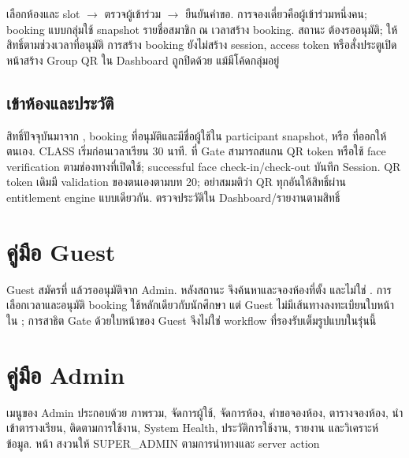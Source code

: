 เลือกห้องและ slot $\rightarrow$ ตรวจผู้เข้าร่วม $\rightarrow$ ยืนยันคำขอ. การจองเดี่ยวคือผู้เข้าร่วมหนึ่งคน; booking แบบกลุ่มใช้ snapshot รายชื่อสมาชิก ณ เวลาสร้าง booking. สถานะ  ต้องรออนุมัติ;  ให้สิทธิ์ตามช่วงเวลาที่อนุมัติ การสร้าง booking ยังไม่สร้าง session, access token หรือสั่งประตูเปิด หน้าสร้าง Group QR ใน Dashboard ถูกปิดด้วย  แม้มีโค้ดกลุ่มอยู่
\section*{เข้าห้องและประวัติ}
สิทธิ์ปัจจุบันมาจาก , booking ที่อนุมัติและมีชื่อผู้ใช้ใน participant snapshot, หรือ  ที่ออกให้ตนเอง. CLASS เริ่มก่อนเวลาเรียน 30 นาที. ที่ Gate สามารถสแกน QR token หรือใช้ face verification ตามช่องทางที่เปิดใช้; successful face check-in/check-out บันทึก Session. QR token เดิมมี validation ของตนเองตามบท 20; อย่าสมมติว่า QR ทุกอันให้สิทธิ์ผ่าน entitlement engine แบบเดียวกัน. ตรวจประวัติใน Dashboard/รายงานตามสิทธิ์

\chapter{คู่มือ Guest}
Guest สมัครที่  แล้วรออนุมัติจาก Admin. หลังสถานะ  จึงค้นหาและจองห้องที่ตั้ง  และไม่ใช่ . การเลือกเวลาและอนุมัติ booking ใช้หลักเดียวกับนักศึกษา แต่ Guest ไม่มีเส้นทางลงทะเบียนใบหน้าใน ; การสาธิต Gate ด้วยใบหน้าของ Guest จึงไม่ใช่ workflow ที่รองรับเต็มรูปแบบในรุ่นนี้

\begin{enumerate}
\end{enumerate}

\chapter{คู่มือ Admin}
เมนูของ Admin ประกอบด้วย ภาพรวม, จัดการผู้ใช้, จัดการห้อง, คำขอจองห้อง, ตารางจองห้อง, นำเข้าตารางเรียน, ติดตามการใช้งาน, System Health, ประวัติการใช้งาน, รายงาน และวิเคราะห์ข้อมูล. หน้า  สงวนให้ SUPER\_ADMIN ตามการนำทางและ server action


